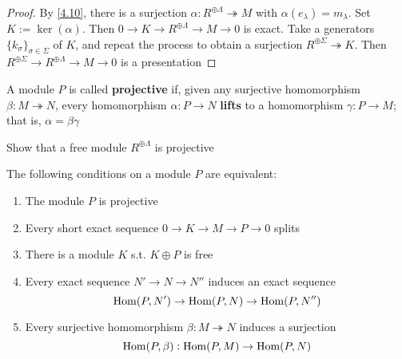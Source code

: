\documentclass[11pt]{article}
\begin{document}
\begin{proof}
By \ref{4.10}, there is a surjection \(\alpha:R^{\oplus\Lambda}\twoheadrightarrow
   M\) with \(\alpha(e_\lambda)=m_\lambda\). Set \(K:=\ker(\alpha)\). Then
\(0\to K\to R^{\oplus\Lambda}\to M\to0\) is exact. Take a generators
\(\{k_\sigma\}_{\sigma\in\Sigma}\) of \(K\), and repeat the process to obtain
a surjection \(R^{\oplus\Sigma}\twoheadrightarrow K\). Then
\(R^{\oplus\Sigma}\to R^{\oplus\Lambda}\to M\to0\) is a presentation
\end{proof}

\begin{definition}[]
A module \(P\) is called \textbf{projective} if, given any surjective homomorphism
\(\beta:M\twoheadrightarrow N\), every homomorphism \(\alpha:P\to N\) \textbf{lifts} to a
homomorphism \(\gamma:P\to M\); that is, \(\alpha=\beta\gamma\)
\end{definition}

\begin{exercise}
\label{5.21}
Show that a free module \(R^{\oplus\Lambda}\) is projective
\end{exercise}

\begin{theorem}[]
The following conditions on a module \(P\) are equivalent:
\begin{enumerate}
\item The module \(P\) is projective
\item Every short exact sequence \(0\to K\to M\to P\to 0\) splits
\item There is a module \(K\) s.t. \(K\oplus P\)
is free
\item Every exact sequence \(N'\to N\to N''\) induces an exact sequence
\begin{equation*}
\operatorname{Hom}(P,N')\to\operatorname{Hom}(P,N)\to\operatorname{Hom}(P,N'')
\end{equation*}
\item Every surjective homomorphism \(\beta:M\twoheadrightarrow N\) induces a
surjection
\begin{equation*}
\operatorname{Hom}(P,\beta):\operatorname{Hom}(P,M)\to\operatorname{Hom}(P,N)
\end{equation*}
\end{enumerate}
\end{theorem}
\end{document}
